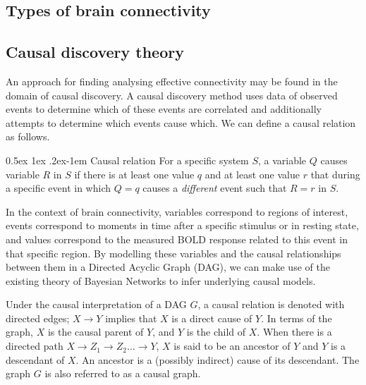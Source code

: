 \documentclass[a4paper, 10pt, english, onecolumn]{article}
\makeatletter
\renewcommand{\paragraph}{%
  \@startsection{paragraph}{4}%
  {\z@}{0.5ex \@plus 1ex \@minus .2ex}{-1em}%
  {\normalfont\normalsize\bfseries}%
}
\makeatother
\begin{document}
\subsection{Types of brain connectivity}%

\subsection{Causal discovery theory}
An approach for finding analysing effective connectivity may be found in the domain of causal discovery.
A causal discovery method uses data of observed events to determine which of these events are correlated and additionally attempts to determine which events cause which.
We can define a causal relation as follows.

\paragraph{Causal relation}
For a specific system $S$, a variable $Q$ causes variable $R$ in $S$ if there is at least one value $q$ and at least one value $r$ that during a specific event in which $Q=q$ causes a \textit{different} event such that $R = r$ in $S$\cite[p.21]{spirtes2000}.

In the context of brain connectivity, variables correspond to regions of interest, events correspond to moments in time after a specific stimulus or in resting state, and values correspond to the measured BOLD response related to this event in that specific region.
By modelling these variables and the causal relationships between them in a Directed Acyclic Graph (DAG), we can make use of the existing theory of Bayesian Networks to infer underlying causal models.

Under the causal interpretation of a DAG $G$, a causal relation is denoted with directed edges; $X \rightarrow Y$ implies that $X$ is a direct cause of $Y$.
In terms of the graph, $X$ is the causal parent of $Y$, and $Y$ is the child of $X$. 
When there is a directed path $X \rightarrow Z_1 \rightarrow Z_2 \dots \rightarrow Y$, $X$ is said to be an ancestor of $Y$ and $Y$ is a descendant of $X$.
An ancestor is a (possibly indirect) cause of its descendant.
The graph $G$ is also referred to as a causal graph.
\end{document}
